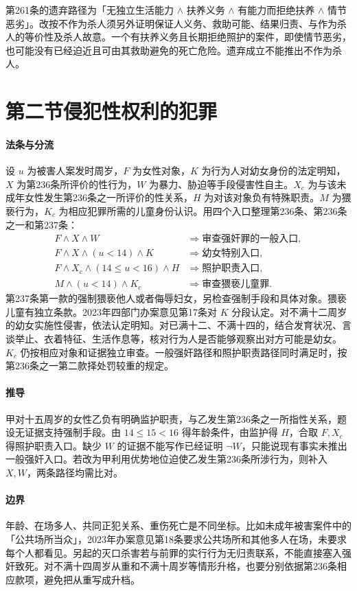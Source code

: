第261条的遗弃路径为「无独立生活能力 $\land$ 扶养义务 $\land$ 有能力而拒绝扶养 $\land$ 情节恶劣」。改按不作为杀人须另外证明保证人义务、救助可能、结果归责、与作为杀人的等价性及杀人故意。一个有扶养义务且长期拒绝照护的案件，即使情节恶劣，也可能没有已经迫近且可由其救助避免的死亡危险。遗弃成立不能推出不作为杀人。

\section{第二节\quad 侵犯性权利的犯罪}

\paragraph{法条与分流}
设 $u$ 为被害人案发时周岁，$F$ 为女性对象，$K$ 为行为人对幼女身份的法定明知，$X$ 为第236条所评价的性行为，$W$ 为暴力、胁迫等手段侵害性自主。$X_c$ 为与该未成年女性发生第236条之一所评价的性关系，$H$ 为对该对象负有特殊职责。$M$ 为猥亵行为，$K_c$ 为相应犯罪所需的儿童身份认识。用四个入口整理第236条、第236条之一和第237条：
\[
\begin{aligned}
 F\land X\land W&\Longrightarrow \text{审查强奸罪的一般入口},\\
 F\land X\land (u<14)\land K&\Longrightarrow \text{幼女特别入口},\\
 F\land X_c\land (14\le u<16)\land H&\Longrightarrow \text{照护职责入口},\\
 M\land (u<14)\land K_c&\Longrightarrow \text{审查猥亵儿童罪}.
\end{aligned}
\]
第237条第一款的强制猥亵他人或者侮辱妇女，另检查强制手段和具体对象。猥亵儿童有独立条款。2023年四部门办案意见第17条对 $K$ 分段认定。对不满十二周岁的幼女实施性侵害，依法认定明知。对已满十二、不满十四的，结合发育状况、言谈举止、衣着特征、生活作息等，核对行为人是否能够观察出对方可能是幼女。$K_c$ 仍按相应对象和证据独立审查。一般强奸路径和照护职责路径同时满足时，按第236条之一第二款择处罚较重的规定。

\paragraph{推导}
甲对十五周岁的女性乙负有明确监护职责，与乙发生第236条之一所指性关系，题设无证据支持强制手段。由 $14\le 15<16$ 得年龄条件，由监护得 $H$，合取 $F,X_c$ 得照护职责入口。缺少 $W$ 的证据不能写作已经证明 $\neg W$，只能说现有事实未推出一般强奸入口。若改为甲利用优势地位迫使乙发生第236条所涉行为，则补入 $X,W$，两条路径均需比对。

\paragraph{边界}
年龄、在场多人、共同正犯关系、重伤死亡是不同坐标。比如未成年被害案件中的「公共场所当众」，2023年办案意见第18条要求公共场所和其他多人在场，未要求每个人都看见。另起的灭口杀害若与前罪的实行行为无归责联系，不能直接塞入强奸致死。对不满十四周岁从重和不满十周岁等情形升格，也要分别依据第236条相应款项，避免把从重写成升档。

